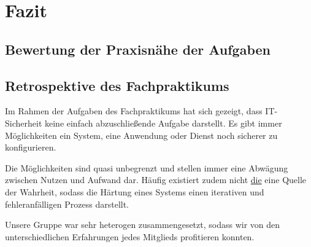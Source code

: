 \section{Fazit}

\subsection{Bewertung der Praxisnähe der Aufgaben}

\subsection{Retrospektive des Fachpraktikums}
Im Rahmen der Aufgaben des Fachpraktikums hat sich gezeigt, dass IT-Sicherheit keine einfach abzuschließende Aufgabe darstellt. Es gibt immer Möglichkeiten ein System, eine Anwendung oder Dienst noch sicherer zu konfigurieren. 

Die Möglichkeiten sind quasi unbegrenzt und stellen immer eine Abwägung zwischen Nutzen und Aufwand dar. Häufig existiert zudem nicht \underline{die} eine Quelle der Wahrheit, sodass die Härtung eines Systems einen iterativen und fehleranfälligen Prozess darstellt.

Unsere Gruppe war sehr heterogen zusammengesetzt, sodass wir von den unterschiedlichen Erfahrungen jedes Mitglieds profitieren konnten. 